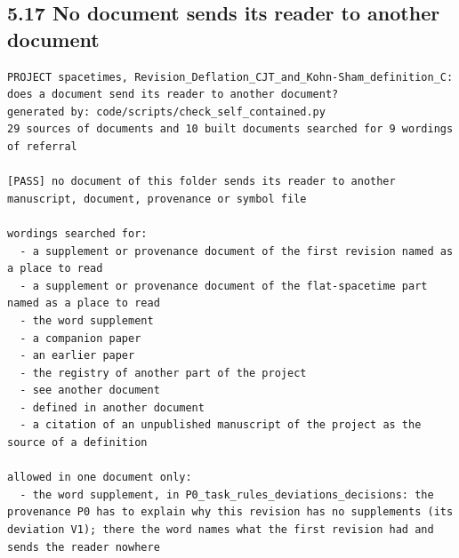 \documentclass[
  10pt,
]{article}
\begin{document}
\hypertarget{no-document-sends-its-reader-to-another-document}{%
\subsection{5.17 No document sends its reader to another
document}\label{no-document-sends-its-reader-to-another-document}}

\begin{verbatim}
PROJECT spacetimes, Revision_Deflation_CJT_and_Kohn-Sham_definition_C: does a document send its reader to another document?
generated by: code/scripts/check_self_contained.py
29 sources of documents and 10 built documents searched for 9 wordings of referral

[PASS] no document of this folder sends its reader to another manuscript, document, provenance or symbol file

wordings searched for:
  - a supplement or provenance document of the first revision named as a place to read
  - a supplement or provenance document of the flat-spacetime part named as a place to read
  - the word supplement
  - a companion paper
  - an earlier paper
  - the registry of another part of the project
  - see another document
  - defined in another document
  - a citation of an unpublished manuscript of the project as the source of a definition

allowed in one document only:
  - the word supplement, in P0_task_rules_deviations_decisions: the provenance P0 has to explain why this revision has no supplements (its deviation V1); there the word names what the first revision had and sends the reader nowhere


\end{verbatim}
\end{document}

